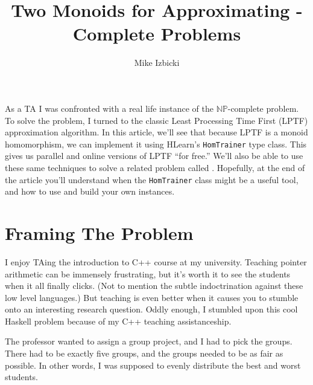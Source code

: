 \documentclass[tikz]{tmr}
\title{Two Monoids for Approximating \np-Complete Problems}
\author{Mike Izbicki\email{mike@izbicki.me}}
\newcommand\h{\lstinline}
\newcommand{\prob}[1]{{\sc {#1}}}
\newcommand{\np}{{\ensuremath{\mathbb{NP}}}}
\newcommand\+{\mdoubleplus}
\begin{document}
\begin{introduction}
As a TA I was confronted with a real life instance of the \np-complete \prob{Scheduling} problem.
To solve the problem, I turned to the classic Least Processing Time First (LPTF) approximation algorithm.
In this article, we'll see that because LPTF is a monoid homomorphism, we can implement it using HLearn's \h{HomTrainer} type class.
This gives us parallel and online versions of LPTF ``for free.''
We'll also be able to use these same techniques to solve a related problem called \prob{Bin Packing}.
Hopefully, at the end of the article you'll understand when the \h{HomTrainer} class might be a useful tool, and how to use and build your own instances.
\end{introduction}

\section{Framing The Problem}
I enjoy TAing the introduction to C++ course at my university.
Teaching pointer arithmetic can be immensely frustrating, but it's worth it to see the students when it all finally clicks.  
(Not to mention the subtle indoctrination against these low level languages.)
But teaching is even better when it causes you to stumble onto an interesting research question.  
Oddly enough, I stumbled upon this cool Haskell problem because of my C++ teaching assistanceship.

The professor wanted to assign a group project, and I had to pick the groups.
There had to be exactly five groups, and the groups needed to be as fair as possible.
In other words, I was supposed to evenly distribute the best and worst students.
\end{document}
